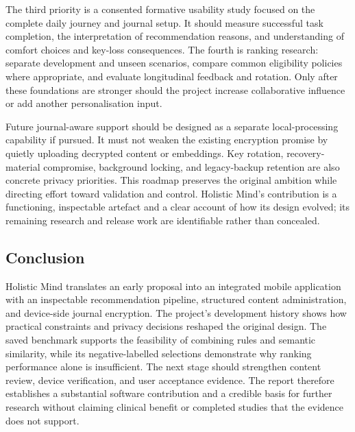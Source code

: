 The third priority is a consented formative usability study focused on the complete daily journey and journal setup. It should measure successful task completion, the interpretation of recommendation reasons, and understanding of comfort choices and key-loss consequences. The fourth is ranking research: separate development and unseen scenarios, compare common eligibility policies where appropriate, and evaluate longitudinal feedback and rotation. Only after these foundations are stronger should the project increase collaborative influence or add another personalisation input.

Future journal-aware support should be designed as a separate local-processing capability if pursued. It must not weaken the existing encryption promise by quietly uploading decrypted content or embeddings. Key rotation, recovery-material compromise, background locking, and legacy-backup retention are also concrete privacy priorities. This roadmap preserves the original ambition while directing effort toward validation and control. Holistic Mind's contribution is a functioning, inspectable artefact and a clear account of how its design evolved; its remaining research and release work are identifiable rather than concealed.

\subsection{Conclusion}

Holistic Mind translates an early proposal into an integrated mobile application with an inspectable recommendation pipeline, structured content administration, and device-side journal encryption. The project's development history shows how practical constraints and privacy decisions reshaped the original design. The saved benchmark supports the feasibility of combining rules and semantic similarity, while its negative-labelled selections demonstrate why ranking performance alone is insufficient. The next stage should strengthen content review, device verification, and user acceptance evidence. The report therefore establishes a substantial software contribution and a credible basis for further research without claiming clinical benefit or completed studies that the evidence does not support.
